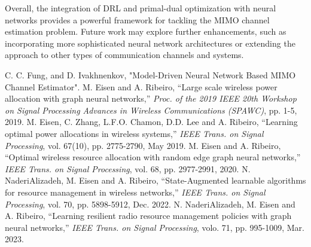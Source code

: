 \documentclass[journal,10pt,twocolumn]{IEEEtran}
\begin{document}
        Overall, the integration of DRL and primal-dual optimization with neural networks provides a powerful framework for tackling the MIMO channel estimation problem. 
        Future work may explore further enhancements, such as incorporating more sophisticated neural network architectures or extending the approach to 
        other types of communication channels and systems.










    \begin{thebibliography}{1}
        C. C. Fung, and D. Ivakhnenkov, "Model-Driven Neural Network Based MIMO Channel Estimator".
        M. Eisen and A. Ribeiro, ``Large scale wireless power allocation with graph neural networks,'' \emph{Proc. of the 2019 IEEE 20th Workshop on Signal Processing Advances in Wireless Communications (SPAWC)}, pp. 1-5, 2019.
        M. Eisen, C. Zhang, L.F.O. Chamon, D.D. Lee and A. Ribeiro, ``Learning optimal power allocations in wireless systems,'' \emph{IEEE Trans. on Signal Processing}, vol. 67(10), pp. 2775-2790, May 2019.
        M. Eisen and A. Ribeiro, ``Optimal wireless resource allocation with random edge graph neural networks,'' \emph{IEEE Trans. on Signal Processing}, vol. 68, pp. 2977-2991, 2020.
        N. NaderiAlizadeh, M. Eisen and A. Ribeiro, ``State-Augmented learnable algorithms for resource management in wireless networks,'' \emph{IEEE Trans. on Signal Processing}, vol. 70, pp. 5898-5912, Dec. 2022.
        N. NaderiAlizadeh, M. Eisen and A. Ribeiro, ``Learning resilient radio resource management policies with graph neural networks,'' \emph{IEEE Trans. on Signal Processing}, volo. 71, pp. 995-1009, Mar. 2023.
    \end{thebibliography}
\end{document}
